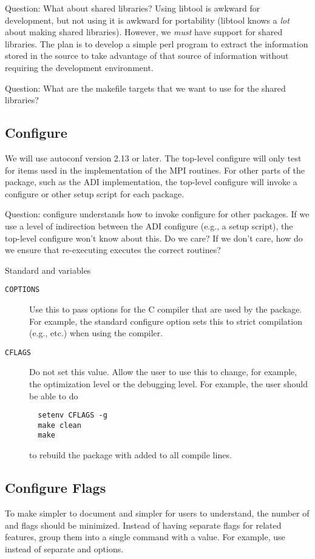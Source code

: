 \documentclass{article}
\begin{document}
Question: What about shared libraries?  Using libtool is awkward for
development, but not using it is awkward for portability (libtool
knows a \emph{lot} about making shared libraries).  However, we
\emph{must} have support for shared libraries.  The plan is to develop
a simple perl program to extract the information stored in the
 source to take advantage of that source of information
without requiring the  development environment.

Question: What are the makefile targets that we want to use for the shared
libraries?

\subsection{Configure}
\label{sec:configure}
We will use autoconf version 2.13 or later.  The top-level configure will only
test for items used in the implementation of the MPI routines.  For
other parts of the package, such as the ADI implementation, the
top-level configure will invoke a configure or other setup script for
each package.

Question: configure understands how to invoke configure for other
packages.  If we use a level of indirection between the ADI configure
(e.g., a setup script), the top-level configure won't know about
this.  Do we care?  If we don't care, how do we ensure that
re-executing  executes the correct routines?

Standard  and  variables
\begin{description}
\item[\texttt{COPTIONS}]Use this to pass options for the C compiler that are
  used by the package.  For example, the standard configure option
   sets this to strict compilation (e.g.,
   etc.) when using the  compiler.

\item[\texttt{CFLAGS}]Do not set this value.  Allow the user to use this to
  change, for example, the optimization level or the debugging level.  For
  example, the user should be able to do
  \begin{verbatim}
  setenv CFLAGS -g
  make clean
  make
  \end{verbatim}
  to rebuild the package with  added to all compile lines.
\end{description}


\subsection{Configure Flags}
\label{sec:config-flags}
To make  simpler to document and simpler for users to
understand, the number of  and  flags should be
minimized.  Instead of having separate  flags for related
features, group them into a single  command with a value.
For example, use  instead of separate
 and  options.  
\end{document}
